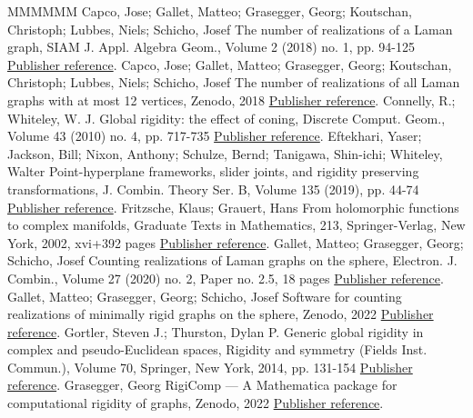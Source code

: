 \begin{thebibliography}{MMMMMM}
 Capco, Jose; Gallet, Matteo; Grasegger, Georg; Koutschan, Christoph; Lubbes, Niels; Schicho, Josef The number of realizations of a Laman graph, SIAM J. Appl. Algebra Geom., Volume 2 (2018) no. 1, pp. 94-125 \href{https://alco.centre-mersenne.org/articles/10.5802/alco.390/#PlaneCount}{Publisher reference}.
 Capco, Jose; Gallet, Matteo; Grasegger, Georg; Koutschan, Christoph; Lubbes, Niels; Schicho, Josef The number of realizations of all Laman graphs with at most 12 vertices, Zenodo, 2018 \href{https://alco.centre-mersenne.org/articles/10.5802/alco.390/#ZenodoData}{Publisher reference}.
 Connelly, R.; Whiteley, W. J. Global rigidity: the effect of coning, Discrete Comput. Geom., Volume 43 (2010) no. 4, pp. 717-735 \href{https://alco.centre-mersenne.org/articles/10.5802/alco.390/#cw10}{Publisher reference}.
 Eftekhari, Yaser; Jackson, Bill; Nixon, Anthony; Schulze, Bernd; Tanigawa, Shin-ichi; Whiteley, Walter Point-hyperplane frameworks, slider joints, and rigidity preserving transformations, J. Combin. Theory Ser. B, Volume 135 (2019), pp. 44-74 \href{https://alco.centre-mersenne.org/articles/10.5802/alco.390/#EJNSTW19}{Publisher reference}.
 Fritzsche, Klaus; Grauert, Hans From holomorphic functions to complex manifolds, Graduate Texts in Mathematics, 213, Springer-Verlag, New York, 2002, xvi+392 pages \href{https://alco.centre-mersenne.org/articles/10.5802/alco.390/#FG02}{Publisher reference}.
 Gallet, Matteo; Grasegger, Georg; Schicho, Josef Counting realizations of Laman graphs on the sphere, Electron. J. Combin., Volume 27 (2020) no. 2, Paper no. 2.5, 18 pages \href{https://alco.centre-mersenne.org/articles/10.5802/alco.390/#SphereCount}{Publisher reference}.
 Gallet, Matteo; Grasegger, Georg; Schicho, Josef Software for counting realizations of minimally rigid graphs on the sphere, Zenodo, 2022 \href{https://alco.centre-mersenne.org/articles/10.5802/alco.390/#SphereAlg}{Publisher reference}.
 Gortler, Steven J.; Thurston, Dylan P. Generic global rigidity in complex and pseudo-Euclidean spaces, Rigidity and symmetry (Fields Inst. Commun.), Volume 70, Springer, New York, 2014, pp. 131-154 \href{https://alco.centre-mersenne.org/articles/10.5802/alco.390/#Gortler2014}{Publisher reference}.
 Grasegger, Georg RigiComp — A Mathematica package for computational rigidity of graphs, Zenodo, 2022 \href{https://alco.centre-mersenne.org/articles/10.5802/alco.390/#RigiComp}{Publisher reference}.

\end{thebibliography}
